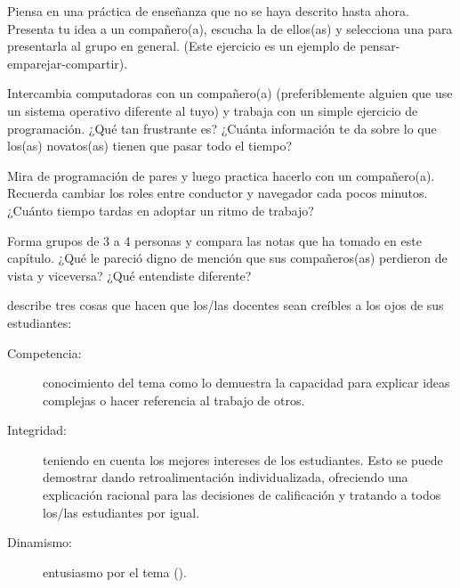 
Piensa en una práctica de enseñanza que no se haya descrito hasta ahora.
Presenta tu idea a un compañero(a),
escucha la de ellos(as)
y selecciona una para presentarla al grupo en general.
(Este ejercicio es un ejemplo de pensar-emparejar-compartir).


Intercambia computadoras con un compañero(a)
(preferiblemente alguien que use un sistema operativo diferente al tuyo)
y trabaja con un simple ejercicio de programación.
¿Qué tan frustrante es?
¿Cuánta información te da sobre lo que los(as) novatos(as) tienen que pasar todo el tiempo?


Mira  de programación de pares
y luego practica hacerlo con un compañero(a).
Recuerda cambiar los roles entre conductor y navegador cada pocos minutos.
¿Cuánto tiempo tardas en adoptar un ritmo de trabajo?


Forma grupos de 3 a 4 personas
y compara las notas que ha tomado en este capítulo.
¿Qué le pareció digno de mención que sus compañeros(as) perdieron de vista y viceversa?
¿Qué entendiste diferente?


\cite{Fink2013} describe tres cosas
que hacen que los/las docentes sean creíbles a los ojos de sus estudiantes:

\begin{description}

\item[Competencia:]
  conocimiento del tema
  como lo demuestra la capacidad para explicar ideas complejas
  o hacer referencia al trabajo de otros.
 
\item[Integridad:]
  teniendo en cuenta los mejores intereses de los estudiantes.
  Esto se puede demostrar dando retroalimentación individualizada,
  ofreciendo una explicación racional para las decisiones de calificación
  y tratando a todos los/las estudiantes por igual.

\item[Dinamismo:]
  entusiasmo por el tema ().

\end{description}

